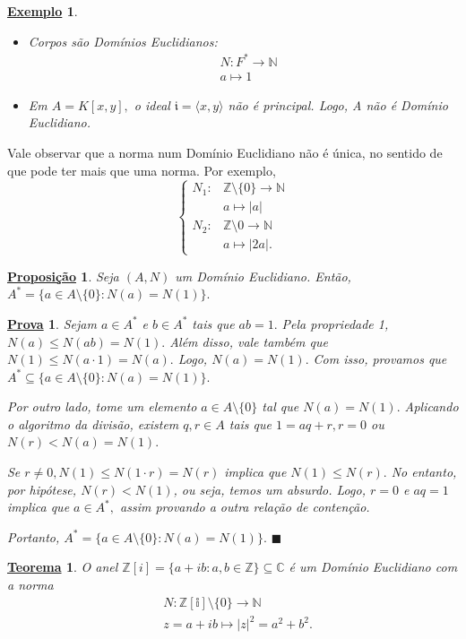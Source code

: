 \documentclass{article}
\newtheorem*{theorem*}{\underline{Teorema}}
\newtheorem*{prop*}{\underline{Proposi\c c\~ao}}
\newtheorem{example}{\underline{Exemplo}}
\newtheorem*{proof*}{\underline{Prova}}
\renewcommand\qedsymbol{$\blacksquare$}
\begin{document}
\begin{example}
  \begin{itemize}
    \item[1)] Corpos são Domínios Euclidianos:
      \begin{align*}
    &N:F^{*}\rightarrow \mathbb{N}\\
    &a\mapsto 1
      \end{align*}
    \item[2)] Em \(A = K[x, y],\) o ideal \(\mathfrak{i} = \langle x, y \rangle\) não é principal. Logo, A não é Domínio Euclidiano.
  \end{itemize}
\end{example}
Vale observar que a norma num Domínio Euclidiano não é única, no sentido de que pode ter mais que uma norma. Por exemplo,
\[
  \left\{\begin{array}{ll}
      N_{1}:&\mathbb{Z}\setminus{\{0\}}\rightarrow \mathbb{N}\\
            &a\mapsto |a|\\
      N_{2}:&\mathbb{Z}\setminus{0}\rightarrow \mathbb{N}\\
            &a\mapsto |2a|.
  \end{array}\right.
\]
\begin{prop*}
  Seja \((A, N)\) um Domínio Euclidiano. Então, \(A^{*}=\{a\in A\setminus{\{0\}}: N(a) = N(1)\}.\)
\end{prop*}
\begin{proof*}
  Sejam \(a\in A^{*}\) e \(b\in A^{*}\) tais que \(ab = 1.\) Pela propriedade 1,
  \(N(a)\leq N(ab) = N(1).\) Além disso, vale também que \(N(1)\leq N(a \cdot 1) = N(a).\) Logo,
  \(N(a) = N(1).\) Com isso, provamos que \(A^{*}\subseteq{\{a\in A\setminus{\{0\}}: N(a) = N(1)\}}.\)

  Por outro lado, tome um elemento \(a\in A\setminus{\{0\}}\) tal que \(N(a) = N(1).\) Aplicando o algoritmo da divisão,
  existem \(q, r\in A\) tais que \(1 = aq + r, r = 0\) ou \(N(r) < N(a) = N(1).\)

  Se \(r\neq0, N(1)\leq N(1 \cdot r) = N(r)\) implica que \(N(1)\leq N(r).\) No entanto, por hipótese,
  \(N(r) < N(1)\), ou seja, temos um absurdo. Logo, \(r = 0\) e \(aq = 1\) implica que \(a\in A^{*},\) assim provando
  a outra relação de contenção.

  Portanto, \(A^{*}=\{a\in A\setminus{\{0\}}: N(a) = N(1)\}.\) \qedsymbol
\end{proof*}
\begin{theorem*}
  O anel \(\mathbb{Z}[i] = \{a + ib: a, b\in \mathbb{Z}\}\subseteq{\mathbb{C}}\) é um Domínio Euclidiano com a norma
  \begin{align*}
   &N:\mathbb{Z[i]}\setminus{\{0\}}\rightarrow \mathbb{N}\\
   &z = a + ib\mapsto |z|^{2} = a^{2} + b^{2}.
  \end{align*}
\end{theorem*}
\end{document}
